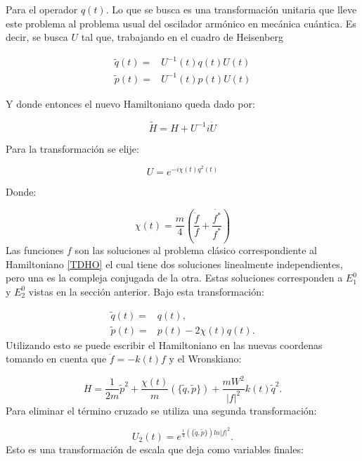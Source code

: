 \documentclass[a4paper,10pt]{report}
\begin{document}
Para el operador $q(t)$. Lo que se busca es una transformación unitaria que lleve este problema al problema usual del oscilador armónico en mecánica cuántica. Es decir, se busca $U$ tal que, trabajando en el cuadro de Heisenberg \cite{SakuraiQM}

\begin{align}
\tilde{q}(t) =& U^{-1}(t)q(t)U(t)\\
\tilde{p}(t) =& U^{-1}(t)p(t)U(t)
\end{align}

Y donde entonces el nuevo Hamiltoniano queda dado por:

\begin{equation}
\tilde{H} = H + U^{-1}i\dot{U}
\end{equation}

Para la transformación se elije:

\begin{equation}
U = e^{-i\chi(t)q^2(t)}
\end{equation}

Donde:

\begin{equation}
\chi(t) = \frac{m}{4}(\frac{\dot{f}}{f}+\frac{\dot{f^*}}{f^*})
\end{equation} Las funciones $f$ son las soluciones al problema clásico correspondiente al Hamiltoniano \ref{TDHO} el cual tiene dos soluciones linealmente independientes, pero una es la compleja conjugada de la otra. Estas soluciones corresponden a $E_1^0$  y $E_2^0$ vistas en la sección anterior. Bajo esta transformación:

\begin{align}
\tilde{q}(t)=&q(t),\\
\tilde{p}(t)=&p(t)-2\chi(t)q(t).
\end{align}Utilizando esto se puede escribir el Hamiltoniano en las nuevas coordenas tomando en cuenta que $\ddot{f}= -k(t)f$ y el Wronskiano:

\begin{equation}
 H = \frac{1}{2m}\tilde{p}^2 + \frac{\chi(t)}{m}(\{\tilde{q},\tilde{p}\}) + \frac{mW^2}{|f|^2}k(t)\tilde{q}^2.
\end{equation}Para eliminar el término cruzado se utiliza una segunda transformación:

\begin{equation}
U_2(t)=e^{\frac{i}{4}(\{\tilde{q},\tilde{p}\})ln|f|^2}.
\end{equation}Esto es una transformación de escala que deja como variables finales:
\end{document}
